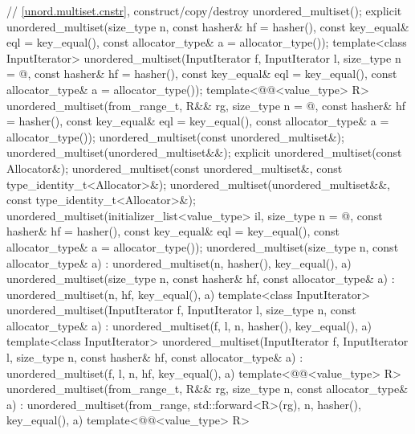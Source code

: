 \begin{codeblock}
{{    // \ref{unord.multiset.cnstr}, construct/copy/destroy
    unordered_multiset();
    explicit unordered_multiset(size_type n,
                                const hasher& hf = hasher(),
                                const key_equal& eql = key_equal(),
                                const allocator_type& a = allocator_type());
    template<class InputIterator>
      unordered_multiset(InputIterator f, InputIterator l,
                         size_type n = @\seebelow@,
                         const hasher& hf = hasher(),
                         const key_equal& eql = key_equal(),
                         const allocator_type& a = allocator_type());
    template<@@<value_type> R>
      unordered_multiset(from_range_t, R&& rg,
                         size_type n = @\seebelow@,
                         const hasher& hf = hasher(),
                         const key_equal& eql = key_equal(),
                         const allocator_type& a = allocator_type());
    unordered_multiset(const unordered_multiset&);
    unordered_multiset(unordered_multiset&&);
    explicit unordered_multiset(const Allocator&);
    unordered_multiset(const unordered_multiset&, const type_identity_t<Allocator>&);
    unordered_multiset(unordered_multiset&&, const type_identity_t<Allocator>&);
    unordered_multiset(initializer_list<value_type> il,
                       size_type n = @\seebelow@,
                       const hasher& hf = hasher(),
                       const key_equal& eql = key_equal(),
                       const allocator_type& a = allocator_type());
    unordered_multiset(size_type n, const allocator_type& a)
      : unordered_multiset(n, hasher(), key_equal(), a) { }
    unordered_multiset(size_type n, const hasher& hf, const allocator_type& a)
      : unordered_multiset(n, hf, key_equal(), a) { }
    template<class InputIterator>
      unordered_multiset(InputIterator f, InputIterator l, size_type n, const allocator_type& a)
        : unordered_multiset(f, l, n, hasher(), key_equal(), a) { }
    template<class InputIterator>
      unordered_multiset(InputIterator f, InputIterator l, size_type n, const hasher& hf,
                         const allocator_type& a)
      : unordered_multiset(f, l, n, hf, key_equal(), a) { }
    template<@@<value_type> R>
      unordered_multiset(from_range_t, R&& rg, size_type n, const allocator_type& a)
        : unordered_multiset(from_range, std::forward<R>(rg),
                             n, hasher(), key_equal(), a) { }
    template<@@<value_type> R>
}}
\end{codeblock}
